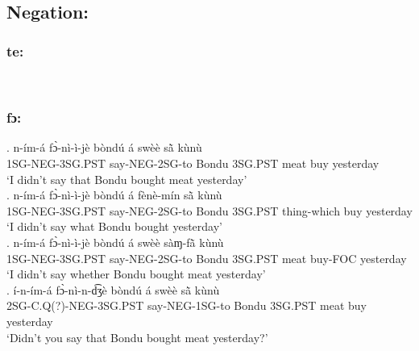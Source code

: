 \documentclass{assets/fieldnotes}
\begin{document}
\\

\subsection{Negation:}



\subsubsection{te:}

\\


\subsubsection{fɔ:}

\exg. n-ím-á fɔ̀-nì-ì-jè bòndú á swèè sã̀  kùnù\\
1SG-NEG-3SG.PST say-NEG-2SG-to Bondu 3SG.PST meat buy yesterday\\
`I didn't say that Bondu bought meat yesterday' \\

\exg. n-ím-á fɔ̀-nì-ì-jè bòndú á fènè-mín sã̀  kùnù\\
1SG-NEG-3SG.PST say-NEG-2SG-to Bondu 3SG.PST thing-which buy yesterday\\
`I didn't say what Bondu bought yesterday' \\

\exg. n-ím-á fɔ̀-nì-ì-jè bòndú á swèè sàɱ-fã̀  kùnù\\
1SG-NEG-3SG.PST say-NEG-2SG-to Bondu 3SG.PST meat buy-FOC yesterday\\
`I didn't say whether Bondu bought meat yesterday' \\

\exg. í-n-ím-á fɔ̀-nì-n-d͡ʒè bòndú á swèè sã̀  kùnù\\
2SG-C.Q(?)-NEG-3SG.PST say-NEG-1SG-to Bondu 3SG.PST meat buy yesterday\\
`Didn't you say that Bondu bought meat yesterday?' \\
\end{document}
